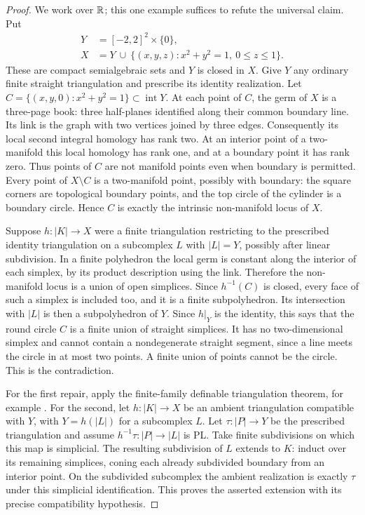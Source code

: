\begin{proof}
We work over $\mathbb R$; this one example suffices to refute the universal
claim. Put
\[
 \begin{split}
 Y&=[-2,2]^2\times\{0\},\\
 X&=Y\ \cup\
 \{(x,y,z):x^2+y^2=1,\ 0\leq z\leq1\}.
 \end{split}
\]
These are compact semialgebraic sets and $Y$ is closed in $X$.
Give $Y$ any ordinary finite straight triangulation and prescribe its
identity realization. Let
$C=\{(x,y,0):x^2+y^2=1\}\subset\operatorname{int}Y$.
At each point of $C$, the germ of $X$ is a three-page book: three
half-planes identified along their common boundary line. Its link is
the graph with two vertices joined by three edges. Consequently its
local second integral homology has rank two. At an interior point of a
two-manifold this local homology has rank one, and at a boundary point
it has rank zero. Thus points of $C$ are not manifold points even when
boundary is permitted. Every point of $X\setminus C$ is a
two-manifold point, possibly with boundary: the square corners are
topological boundary points, and the top circle of the cylinder is a
boundary circle. Hence $C$ is exactly the intrinsic non-manifold locus
of $X$.

Suppose $h:|K|\to X$ were a finite triangulation restricting to the
prescribed identity triangulation on a subcomplex $L$ with $|L|=Y$,
possibly after linear subdivision. In a finite polyhedron the local
germ is constant along the interior of each simplex, by its product
description using the link. Therefore the non-manifold locus is a
union of open simplices. Since $h^{-1}(C)$ is closed, every face of
such a simplex is included too, and it is a finite subpolyhedron.
Its intersection with $|L|$ is then a subpolyhedron of $Y$. Since
$h|_Y$ is the identity, this says that the round circle $C$ is a finite
union of straight simplices. It has no two-dimensional simplex and
cannot contain a nondegenerate straight segment, since a line meets
the circle in at most two points. A finite union of points cannot be
the circle. This is the contradiction.

For the first repair, apply the finite-family definable triangulation
theorem, for example \cite[Theorem 2.2(1), with the constant
function]{Shiota2010}. For the second, let $h:|K|\to X$ be an ambient
triangulation compatible with $Y$, with $Y=h(|L|)$ for a subcomplex
$L$. Let $\tau:|P|\to Y$ be the prescribed triangulation and assume
$h^{-1}\tau:|P|\to|L|$ is PL. Take finite subdivisions on which this
map is simplicial. The resulting subdivision of $L$ extends to $K$:
induct over its remaining simplices, coning each already subdivided
boundary from an interior point. On the subdivided subcomplex the
ambient realization is exactly $\tau$ under this simplicial
identification. This proves the asserted extension with its precise
compatibility hypothesis.
\end{proof}

